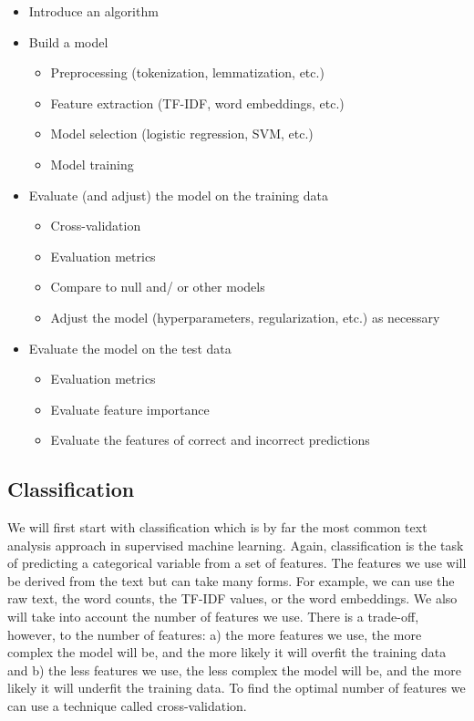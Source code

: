 \documentclass[
  letterpaper,
]{scrbook}
\providecommand{\tightlist}{%
  \setlength{\itemsep}{0pt}\setlength{\parskip}{0pt}}\usepackage{longtable,booktabs,array}
\begin{document}
\begin{itemize}
\tightlist
\item
  Introduce an algorithm
\item
  Build a model

  \begin{itemize}
  \tightlist
  \item
    Preprocessing (tokenization, lemmatization, etc.)
  \item
    Feature extraction (TF-IDF, word embeddings, etc.)
  \item
    Model selection (logistic regression, SVM, etc.)
  \item
    Model training
  \end{itemize}
\item
  Evaluate (and adjust) the model on the training data

  \begin{itemize}
  \tightlist
  \item
    Cross-validation
  \item
    Evaluation metrics
  \item
    Compare to null and/ or other models
  \item
    Adjust the model (hyperparameters, regularization, etc.) as
    necessary
  \end{itemize}
\item
  Evaluate the model on the test data

  \begin{itemize}
  \tightlist
  \item
    Evaluation metrics
  \item
    Evaluate feature importance
  \item
    Evaluate the features of correct and incorrect predictions
  \end{itemize}
\end{itemize}

\hypertarget{pda-classification}{%
\subsection{Classification}\label{pda-classification}}

We will first start with classification which is by far the most common
text analysis approach in supervised machine learning. Again,
classification is the task of predicting a categorical variable from a
set of features. The features we use will be derived from the text but
can take many forms. For example, we can use the raw text, the word
counts, the TF-IDF values, or the word embeddings. We also will take
into account the number of features we use. There is a trade-off,
however, to the number of features: a) the more features we use, the
more complex the model will be, and the more likely it will overfit the
training data and b) the less features we use, the less complex the
model will be, and the more likely it will underfit the training data.
To find the optimal number of features we can use a technique called
cross-validation.
\end{document}
